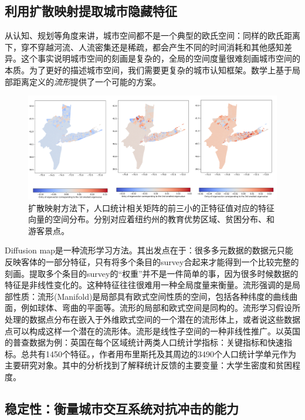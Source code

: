 \subsection{利用扩散映射提取城市隐藏特征}

从认知、规划等角度来讲，城市空间都不是一个典型的欧氏空间：同样的欧氏距离下，穿不穿越河流、人流密集还是稀疏，都会产生不同的时间消耗和其他感知差异。这个事实说明城市空间的刻画是复杂的，全局的空间度量很难刻画城市空间的本质。为了更好的描述城市空间，我们需要更复杂的城市认知框架。数学上基于局部距离定义的\textit{流形}提供了一个可能的方案。

\begin{figure}
    \centering
    \includegraphics[width = 0.99\linewidth]{Figs/diffusionmap.png}
    \caption{扩散映射方法下，人口统计相关矩阵的前三小的正特征值对应的特征向量的空间分布。分别对应着纽约州的教育优势区域、贫困分布、和游客景点。}
    \label{fig:diffusionmap}
\end{figure}

Diffusion map是一种流形学习方法。其出发点在于：很多多元数据的数据元只能反映客体的一部分特征，只有将多个条目的survey合起来才能得到一个比较完整的刻画。提取多个条目的survey的“权重”并不是一件简单的事，因为很多时候数据的特征是非线性变化的。这种特征往往很难用一种全局度量来衡量。流形强调的是局部性质：流形(Manifold)是局部具有欧式空间性质的空间，包括各种纬度的曲线曲面，例如球体、弯曲的平面等。流形的局部和欧式空间是同构的。流形学习假设所处理的数据点分布在嵌入于外维欧式空间的一个潜在的流形体上，或者说这些数据点可以构成这样一个潜在的流形体。流形是线性子空间的一种非线性推广。以英国的普查数据为例：英国在每个区域统计两类人口统计学指标：关键指标和快速指标。总共有1450个特征。\cite{barter2019manifold}，作者用布里斯托及其周边的3490个人口统计学单元作为主要研究对象。其中的分析找到了解释统计反馈的主要变量：大学生密度和贫困程度。

\subsection{稳定性：衡量城市交互系统对抗冲击的能力}


